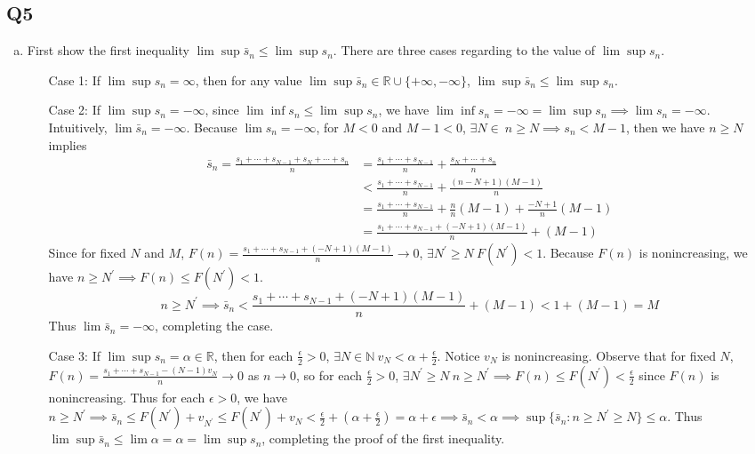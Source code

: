 \documentclass[12pt,lettersize]{article}
\newcommand{\R}{\mathbb{R}}
\newcommand{\N}{\mathbb{N}}
\begin{document}
	\subsection*{Q5}
	\begin{enumerate}[(a)]
		\item First show the first inequality $\lim\sup\bar{s}_n\leq\lim\sup s_n$. There are three cases regarding to the value of $\lim\sup s_n$.
		\begin{itemize}
			\item[Case 1:] If $\lim\sup s_n=\infty$, then for any value $\lim\sup\bar{s}_n\in\R\cup\{+\infty,-\infty\}$, $\lim\sup\bar{s}_n\leq\lim\sup s_n$.
			
			\item[Case 2:] If $\lim\sup s_n=-\infty$, since $\lim\inf s_n\leq\lim\sup s_n$, we have $\lim\inf s_n=-\infty=\lim\sup s_n\implies \lim s_n=-\infty$. Intuitively, $\lim\bar{s}_n=-\infty$.  Because $\lim s_n=-\infty$, for $M<0$ and $M-1<0$, $\exists N\in\ n\geq N\implies s_n<M-1$, then we have $n\geq N$ implies
			\begin{align*}
				\bar{s}_n = \frac{s_1+\cdots+s_{N-1}+s_N+\cdots+s_n}{n} &= \frac{s_1+\cdots+s_{N-1}}{n}+\frac{s_N+\cdots+s_n}{n}\\
				&< \frac{s_1+\cdots+s_{N-1}}{n} + \frac{(n-N+1)(M-1)}{n}\\
				&= \frac{s_1+\cdots+s_{N-1}}{n} + \frac{n}{n}(M-1)+\frac{-N+1}{n}(M-1)\\
				&= \frac{s_1+\cdots+s_{N-1}+(-N+1)(M-1)}{n} + (M-1)
			\end{align*}
			Since for fixed $N$ and $M$, $F(n)=\frac{s_1+\cdots+s_{N-1}+(-N+1)(M-1)}{n}\rightarrow0$, $\exists N^\prime\geq N\ F(N^\prime)<1$. Because $F(n)$ is nonincreasing, we have $n\geq N^\prime\implies F(n)\leq F(N^\prime)<1$.
			\begin{displaymath}
				n\geq N^\prime\implies \bar{s}_n<\frac{s_1+\cdots+s_{N-1}+(-N+1)(M-1)}{n} + (M-1)<1+(M-1)=M
			\end{displaymath}
			Thus $\lim\bar{s}_n=-\infty$, completing the case.
			
			\item[Case 3:] If $\lim\sup s_n=\alpha\in\R$, then for each $\frac{\epsilon}{2}>0$, $\exists N\in\N\ v_N<\alpha+\frac{\epsilon}{2}$. Notice $v_N$ is nonincreasing. Observe that for fixed $N$, $F(n)=\frac{s_1+\cdots+s_{N-1}-(N-1)v_N}{n}\rightarrow 0$ as $n\rightarrow0$, so for each $\frac{\epsilon}{2}>0$, $\exists N^\prime\geq N\ n\geq N^\prime\implies F(n)\leq F(N^\prime)<\frac{\epsilon}{2}$ since $F(n)$ is nonincreasing. Thus for each $\epsilon>0$, we have $n\geq N^\prime\implies \bar{s}_n\leq F(N^\prime)+v_{N^\prime}\leq F(N^\prime)+v_N<\frac{\epsilon}{2}+(\alpha+\frac{\epsilon}{2})=\alpha+\epsilon\implies \bar{s}_n<\alpha\implies \sup\{\bar{s}_n: n\geq N^\prime\geq N\}\leq\alpha$. Thus $\lim\sup\bar{s}_n\leq\lim\alpha=\alpha=\lim\sup s_n$, completing the proof of the first inequality.
		\end{itemize}\bigskip
		

\end{enumerate}
\end{document}
